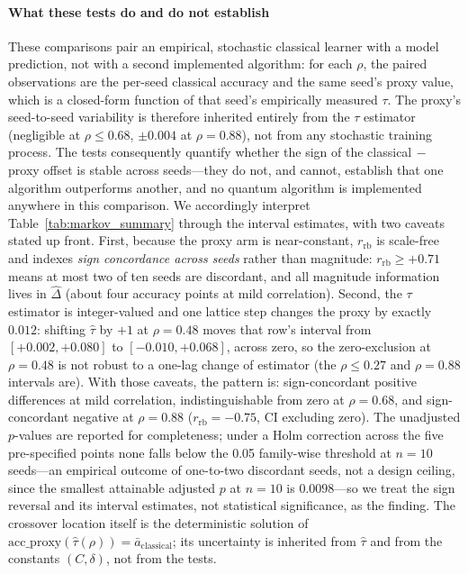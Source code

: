 \documentclass[sensors,article,submit,pdftex,moreauthors]{Definitions/mdpi}
\begin{document}
\paragraph{What these tests do and do not establish} These comparisons pair an empirical, stochastic classical learner with a model prediction, not with a second implemented algorithm: for each $\rho$, the paired observations are the per-seed classical accuracy and the same seed's proxy value, which is a closed-form function of that seed's empirically measured $\tau$. The proxy's seed-to-seed variability is therefore inherited entirely from the $\tau$ estimator (negligible at $\rho \leq 0.68$, $\pm 0.004$ at $\rho = 0.88$), not from any stochastic training process. The tests consequently quantify whether the sign of the classical$\,-\,$proxy offset is stable across seeds---they do not, and cannot, establish that one algorithm outperforms another, and no quantum algorithm is implemented anywhere in this comparison. We accordingly interpret Table~\ref{tab:markov_summary} through the interval estimates, with two caveats stated up front. First, because the proxy arm is near-constant, $r_{\mathrm{rb}}$ is scale-free and indexes \emph{sign concordance across seeds} rather than magnitude: $r_{\mathrm{rb}} \geq +0.71$ means at most two of ten seeds are discordant, and all magnitude information lives in $\hat{\Delta}$ (about four accuracy points at mild correlation). Second, the $\tau$ estimator is integer-valued and one lattice step changes the proxy by exactly $0.012$: shifting $\hat{\tau}$ by $+1$ at $\rho = 0.48$ moves that row's interval from $[+0.002, +0.080]$ to $[-0.010, +0.068]$, across zero, so the zero-exclusion at $\rho = 0.48$ is not robust to a one-lag change of estimator (the $\rho \leq 0.27$ and $\rho = 0.88$ intervals are). With those caveats, the pattern is: sign-concordant positive differences at mild correlation, indistinguishable from zero at $\rho = 0.68$, and sign-concordant negative at $\rho = 0.88$ ($r_{\mathrm{rb}} = -0.75$, CI excluding zero). The unadjusted $p$-values are reported for completeness; under a Holm correction across the five pre-specified points none falls below the 0.05 family-wise threshold at $n = 10$ seeds---an empirical outcome of one-to-two discordant seeds, not a design ceiling, since the smallest attainable adjusted $p$ at $n = 10$ is $0.0098$---so we treat the sign reversal and its interval estimates, not statistical significance, as the finding. The crossover location itself is the deterministic solution of $\mathrm{acc\_proxy}(\hat{\tau}(\rho)) = \bar{a}_{\mathrm{classical}}$; its uncertainty is inherited from $\hat{\tau}$ and from the constants $(C, \delta)$, not from the tests.
\end{document}

